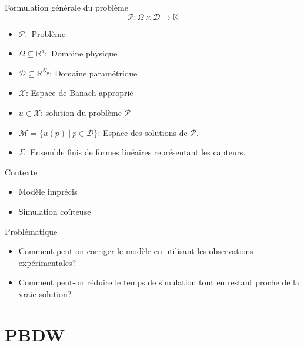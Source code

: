 \documentclass[a4paper,10pt]{beamer}
\numberwithin{equation}{section}
\begin{document}
\begin{frame}

\begin{block}{\sc Formulation générale du problème}
	\begin{equation}
	\mathcal{P}: \Omega \times \mathcal{D} \rightarrow \mathbb{K}
	\end{equation}	
	\begin{itemize}
		\item $ \mathcal{P}:$ Problème 
		\item $ \Omega \subseteq \mathbb{R}^{d}:$ Domaine physique 
		\item $ \mathcal{D} \subseteq \mathbb{R}^{N_{p}}$: Domaine paramétrique
		\item $ \mathcal{X}$: Espace de Banach approprié
		\item $ u \in \mathcal{X}$: solution du problème $\mathcal{P}$ 
		\item $\mathcal{M}=\{u(p)\  |\  p\in \mathcal{D}\}$: Espace des solutions de $\mathcal{P}$.
		\item $\Sigma$: Ensemble finis de formes linéaires représentant les capteurs.
	\end{itemize}
\end{block}

\end{frame}
\begin{frame}
\begin{block}{\sc Contexte}
	\pause
	\begin{itemize}[<+->]
		\item Modèle imprécis
		\item Simulation coûteuse
	\end{itemize}
\pause
\end{block}

\begin{block}{\sc Problématique}
	\pause
	\begin{itemize}[<+->]
		\item Comment peut-on corriger le modèle en utilisant les observations expérimentales?
		\item Comment peut-on réduire le temps de simulation tout en restant proche de la vraie solution?
	\end{itemize}
\end{block}
\end{frame}

\section{\sc PBDW}
\end{document}
